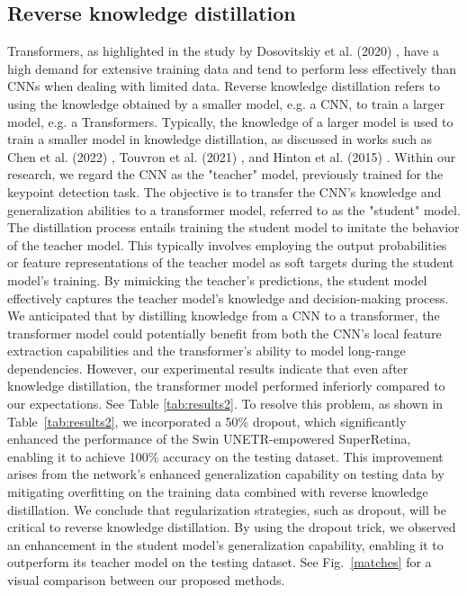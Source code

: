 \documentclass[10pt,twocolumn,letterpaper]{article}
\begin{document}
\subsection{Reverse knowledge distillation}
Transformers, as highlighted in the study by Dosovitskiy et al. (2020) \cite{dosovitskiy2020image}, have a high demand for extensive training data and tend to perform less effectively than CNNs when dealing with limited data. Reverse knowledge distillation refers to using the knowledge obtained by a smaller model, e.g. a CNN, to train a larger model, e.g. a Transformers. Typically, the knowledge of a larger model is used to train a smaller model in knowledge distillation, as discussed in works such as Chen et al. (2022) \cite{chen2022dearkd}, Touvron et al. (2021) \cite{touvron2021training}, and Hinton et al. (2015) \cite{hinton2015distilling}. Within our research, we regard the CNN as the "teacher" model, previously trained for the keypoint detection task. The objective is to transfer the CNN's knowledge and generalization abilities to a transformer model, referred to as the "student" model. The distillation process entails training the student model to imitate the behavior of the teacher model. This typically involves employing the output probabilities or feature representations of the teacher model as soft targets during the student model's training. By mimicking the teacher's predictions, the student model effectively captures the teacher model's knowledge and decision-making process. We anticipated that by distilling knowledge from a CNN to a transformer, the transformer model could potentially benefit from both the CNN's local feature extraction capabilities and the transformer's ability to model long-range dependencies. However, our experimental results indicate that even after knowledge distillation, the transformer model performed inferiorly compared to our expectations. See Table \ref{tab:results2}. To resolve this problem, as shown in Table~\ref{tab:results2}, we incorporated a 50\% dropout, which significantly enhanced the performance of the Swin UNETR-empowered SuperRetina, enabling it to achieve 100\% accuracy on the testing dataset. This improvement arises from the network's enhanced generalization capability on testing data by mitigating overfitting on the training data combined with reverse knowledge distillation. We conclude that regularization strategies, such as dropout, will be critical to reverse knowledge distillation. By using the dropout trick, we observed an enhancement in the student model's generalization capability, enabling it to outperform its teacher model on the testing dataset.
See Fig.~\ref{matches} for a visual comparison between our proposed methods.
\end{document}
